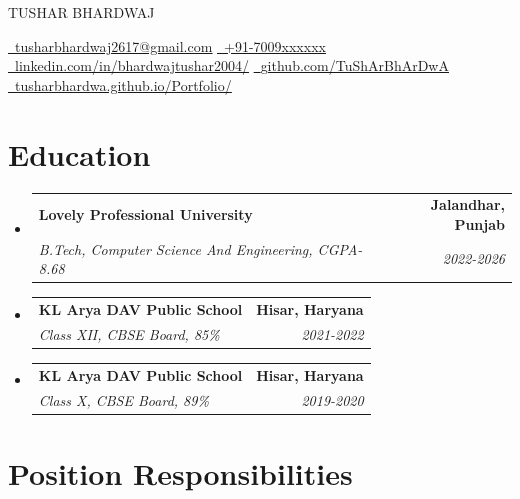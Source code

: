 \documentclass[letterpaper,11pt]{article}
\makeatletter
\newcommand{\resumeSubheading}[4]{
  \vspace{-3pt}\item
    \begin{tabular*}{1.0\textwidth}[t]{l@{\extracolsep{\fill}}r}
      \textbf{#1} & \textbf{\small #2} \\
      \textit{\small#3} & \textit{\small #4} \\
    \end{tabular*}\vspace{-7pt}
}
\newcommand{\resumeSubHeadingListStart}{\begin{itemize}[leftmargin=0.0in, label={}]}
\newcommand{\resumeSubHeadingListEnd}{\end{itemize}}
\makeatother
\begin{document}
   \begin{center}
    {\Huge\scshape  TUSHAR BHARDWAJ} \\
    \vspace{3pt}
    \small
    \vspace{10pt}

    \href{mailto:tusharbhardwaj2617@gmail.com}{\raisebox{-0.2\height}\faEnvelope\ \underline{tusharbhardwaj2617@gmail.com}} \hspace{10pt}
    \href{tel:+917009xxxxxx}{\raisebox{-0.2\height}\Telefon\ \underline{+91-7009xxxxxx}} \\ 
    \vspace{6pt}
    \href{https://www.linkedin.com/in/bhardwajtushar2004/}{\faLinkedin\ \underline{linkedin.com/in/bhardwajtushar2004/}} \hspace{10pt}
    \href{https://github.com/TuShArBhArDwA}{\faGithub\ \underline{github.com/TuShArBhArDwA}} \hspace{10pt}
    \href{https://tusharbhardwa.github.io/Portfolio/}{
    \faBriefcase\ \underline{tusharbhardwa.github.io/Portfolio/}}
\end{center}
\vspace{3pt}

 \section{Education}
  \resumeSubHeadingListStart
  
    \resumeSubheading
    {Lovely Professional University}{Jalandhar, Punjab}
    {B.Tech, Computer Science And Engineering, CGPA-8.68}{2022-2026}
  \resumeSubHeadingListEnd
  \resumeSubHeadingListStart
  
    \resumeSubheading
    {KL Arya DAV Public School}{Hisar, Haryana}
    {Class XII, CBSE Board, 85\%}{2021-2022}    
  \resumeSubHeadingListEnd

    \resumeSubHeadingListStart

    
    \resumeSubheading
    {KL Arya DAV Public School}{Hisar, Haryana}
    {Class X, CBSE Board, 89\%}{2019-2020}

    \resumeSubHeadingListEnd
    \vspace{3pt}
 \section{Position Responsibilities}
  
\end{document}
